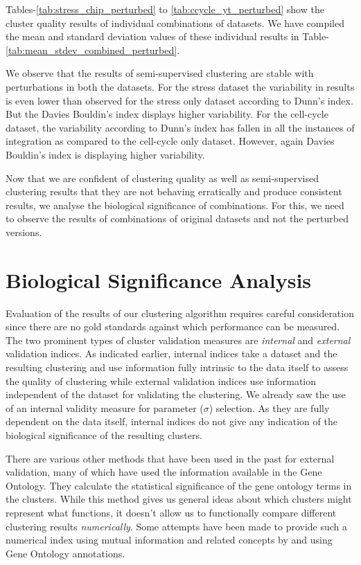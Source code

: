 Tables-\ref{tab:stress_chip_perturbed} to \ref{tab:ccycle_yt_perturbed} show the cluster quality results of individual combinations of datasets. We have compiled the mean 
and standard deviation values of these individual results in Table-\ref{tab:mean_stdev_combined_perturbed}. 

We observe that the results of semi-supervised clustering are stable with perturbations in both the datasets. For the stress dataset the variability in results is even lower than
 observed for the stress only dataset according to Dunn's index. But the Davies Bouldin's index displays higher variability. For the cell-cycle dataset, the variability according to Dunn's
 index has fallen in all the instances of integration as compared to the cell-cycle only dataset. However, again Davies Bouldin's index is displaying higher variability.
  
Now that we are confident of clustering quality as well as semi-supervised clustering results that they are not behaving erratically and produce consistent results, 
we analyse the biological significance of combinations. For this, we need to observe the results of combinations of original datasets 
and not the perturbed versions. 

\section{Biological Significance Analysis}
Evaluation of the results of our clustering algorithm requires careful consideration since there are no gold standards against which performance can be measured. 
The two prominent types of cluster validation measures are \textit{internal} and \textit{external} validation indices. As indicated earlier, internal indices take a dataset and 
the resulting clustering and use information fully intrinsic to the data itself to assess the quality of clustering while external validation indices use information independent 
of the dataset for validating the clustering. We already saw the use of an internal validity measure for parameter ($\sigma$) selection. As they are fully dependent on the 
data itself, internal indices do not give any indication of the biological significance of the resulting clusters.  

There are various other methods that have been used in the past for external validation, many of which have used the information available in the Gene Ontology. 
They calculate the statistical significance of the gene ontology terms in the clusters. While this method gives us general ideas about which clusters might represent 
what functions, it doesn't allow us to functionally compare different clustering results \textit{numerically}. Some attempts have been made to provide 
such a numerical index using mutual information and related concepts by \citet{Gibons2002Judging} and \citet{gatviks03scoring} using Gene Ontology annotations. 

